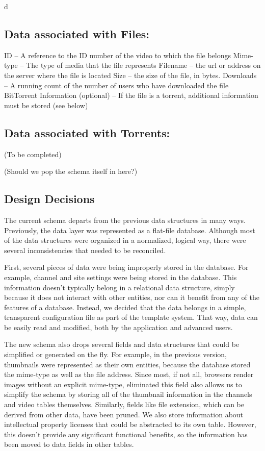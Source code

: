 d\documentclass[a4paper,12pt]{report}
\begin{document}
\subsection{Data associated with Files:}
ID – A reference to the ID number of the video to which the file belongs
Mime-type – The type of media that the file represents
Filename – the url or address on the server where the file is located
Size – the size of the file, in bytes.
Downloads – A running count of the number of users who have downloaded the file
BitTorrent Information (optional) – If the file is a torrent, additional information must be stored (see below)

\subsection{Data associated with Torrents:}
(To be completed)

(Should we pop the schema itself in here?)

\subsection{Design Decisions}
The current schema departs from the previous data structures in many ways. Previously, the data layer was represented as a flat-file database. 
Although most of the data structures were organized in a normalized, logical way, there were several inconsistencies that needed to be reconciled.

First, several pieces of data were being improperly stored in the database. For example, channel and site settings were being stored in the database. This information doesn't typically belong in a relational data structure, simply because it does not interact with other entities, nor can it benefit from any of the features of a database. 
Instead, we decided that the data belongs in a simple, transparent configuration file as part of the template system. 
That way, data can be easily read and modified, both by the application and advanced users. 

The new schema also drops several fields and data structures that could be simplified or generated on the fly. 
For example, in the previous version, thumbnails were represented as their own entities, because the database stored the mime-type as well as the file address. 
Since most, if not all, browsers render images without an explicit mime-type, eliminated this field also allows us to simplify the schema by storing all of the thumbnail information in the channels and video tables themselves. Similarly, fields like file extension, which can be derived from other data, have been pruned. 
We also store information about intellectual property licenses that could be abstracted to its own table. 
However, this doesn't provide any significant functional benefits, so the information has been moved to data fields in other tables.
\end{document}
